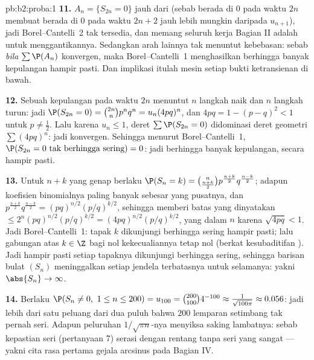 \begin{solution}{pb:b2:proba:1}
\textbf{11.}  $A_n = \{S_{2n} = 0\}$ jauh dari
 (sebab berada di $0$ pada waktu $2n$ membuat berada di $0$ pada
waktu $2n + 2$ jauh lebih mungkin daripada $u_{n+1}$), jadi
Borel--Cantelli~2 tak tersedia, dan memang seluruh kerja
Bagian II adalah untuk menggantikannya. Sedangkan arah lainnya tak menuntut
kebebasan: sebab \emph{bila} $\sum\P(A_n)$ konvergen, maka
Borel--Cantelli~1 menghasilkan berhingga banyak kepulangan hampir pasti.
Dan implikasi itulah mesin setiap bukti ketransienan
di bawah.

\textbf{12.} Sebuah kepulangan pada waktu $2n$ menuntut $n$ langkah naik dan $n$
langkah turun: jadi $\P(S_{2n} = 0) = \binom{2n}np^nq^n =
u_n(4pq)^n$, dan $4pq = 1 - (p - q)^2 < 1$ untuk $p \neq
\frac12$. Lalu karena $u_n \leq 1$, deret $\sum\P(S_{2n} = 0)$
didominasi deret geometri $\sum(4pq)^n$: jadi konvergen. Sehingga menurut
Borel--Cantelli~1, $\P(S_{2n} = 0 \text{ tak berhingga sering}) =
0$: jadi berhingga banyak kepulangan, secara hampir pasti.

\textbf{13.} Untuk $n + k$ yang genap berlaku $\P(S_n = k) =
\binom{n}{\frac{n+k}2}p^{\frac{n+k}2}q^{\frac{n-k}2}$; adapun
koefisien binomialnya paling banyak sebesar yang pusatnya, dan
$p^{\frac{n+k}2}q^{\frac{n-k}2} = (pq)^{n/2}(p/q)^{k/2}$,
sehingga memberi batas yang dinyatakan $\leq
2^n(pq)^{n/2}(p/q)^{k/2} = (4pq)^{n/2}(p/q)^{k/2}$, yang 
dalam $n$ karena $\sqrt{4pq} < 1$. Jadi Borel--Cantelli~1: tapak $k$
dikunjungi berhingga sering hampir pasti; lalu gabungan atas $k \in
\Z$ bagi  nol kekecualiannya tetap nol (berkat kesubaditifan
). Jadi hampir pasti setiap tapaknya dikunjungi berhingga
sering, sehingga barisan bulat $(S_n)$ meninggalkan setiap jendela terbatasnya
untuk selamanya: yakni $\abs{S_n} \to \infty$.

\textbf{14.} Berlaku $\P(S_n \neq 0,\ 1 \leq n \leq 200) = u_{100} =
\binom{200}{100}4^{-100} \approx \frac1{\sqrt{100\pi}}
\approx 0.056$: jadi lebih dari satu peluang dari dua puluh bahwa $200$
lemparan setimbang tak pernah seri. Adapun peluruhan $1/\sqrt{\pi n}$-nya
menyiksa saking lambatnya: sebab kepastian seri (pertanyaan 7)
serasi dengan rentang tanpa seri yang sangat  --- yakni cita
rasa pertama gejala arcsinus pada Bagian IV.


\end{solution}
